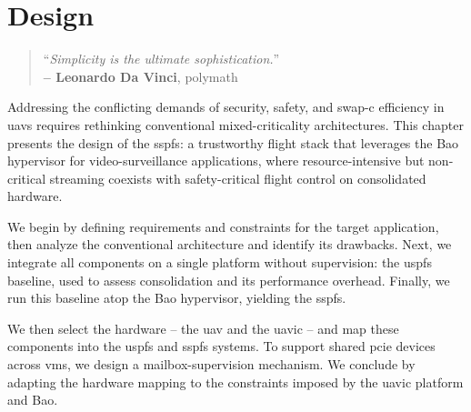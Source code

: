 %
\chapter{Design}%
\label{ch:design}
\begin{quote}
\begin{flushright}
``\emph{Simplicity is the ultimate sophistication.}'' \\
\textbf{-- Leonardo Da Vinci}, polymath
\end{flushright}
\end{quote}

Addressing the conflicting demands of security, safety, and \gls{swap-c}
efficiency in \glspl{uav} requires rethinking conventional mixed-criticality
architectures. This chapter presents the design of the \gls{sspfs}: a
trustworthy flight stack that leverages the Bao hypervisor for
video-surveillance applications, where resource-intensive but non-critical
streaming coexists with safety-critical flight control on consolidated hardware.

We begin by defining requirements and constraints for the target application,
then analyze the conventional architecture and identify its drawbacks. Next, we
integrate all components on a single platform without supervision: the
\gls{uspfs} baseline, used to assess consolidation and its performance
overhead. Finally, we run this baseline atop the Bao hypervisor, yielding the
\gls{sspfs}.

We then select the hardware -- the \gls{uav} and the \gls{uavic} -- and map these
components into the \gls{uspfs} and \gls{sspfs} systems. To support shared
\gls{pcie} devices across \glspl{vm}, we design a mailbox-supervision
mechanism. We conclude by adapting the hardware mapping to the constraints
imposed by the \gls{uavic} platform and Bao.



